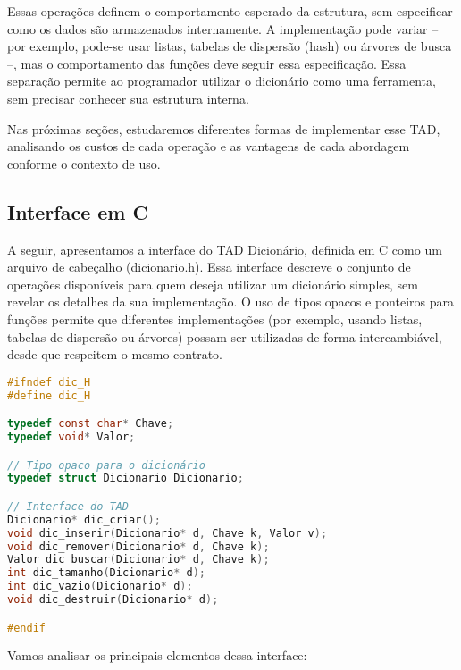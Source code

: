Essas operações definem o comportamento esperado da estrutura, sem especificar como os dados são armazenados internamente. 
A implementação pode variar -- por exemplo, pode-se usar listas, tabelas de dispersão (hash) ou árvores de busca --, mas o comportamento das funções deve seguir essa especificação. 
Essa separação permite ao programador utilizar o dicionário como uma ferramenta, sem precisar conhecer sua estrutura interna.

Nas próximas seções, estudaremos diferentes formas de implementar esse TAD, analisando os custos de cada operação e as vantagens de cada abordagem conforme o contexto de uso.


\subsection{Interface em C}

A seguir, apresentamos a interface do TAD Dicionário, definida em C como um arquivo de cabeçalho (dicionario.h). 
Essa interface descreve o conjunto de operações disponíveis para quem deseja utilizar um dicionário simples, sem revelar os detalhes da sua implementação. 
O uso de tipos opacos e ponteiros para funções permite que diferentes implementações (por exemplo, usando listas, tabelas de dispersão ou árvores) possam ser utilizadas de forma intercambiável, desde que respeitem o mesmo contrato.

\begin{lstlisting}[language=C, caption={Interface do TAD Dicionário}, label={lst:dicionario-h}]
#ifndef dic_H
#define dic_H

typedef const char* Chave;
typedef void* Valor;

// Tipo opaco para o dicionário
typedef struct Dicionario Dicionario;

// Interface do TAD
Dicionario* dic_criar();
void dic_inserir(Dicionario* d, Chave k, Valor v);
void dic_remover(Dicionario* d, Chave k);
Valor dic_buscar(Dicionario* d, Chave k);
int dic_tamanho(Dicionario* d);
int dic_vazio(Dicionario* d);
void dic_destruir(Dicionario* d);

#endif
\end{lstlisting}

Vamos analisar os principais elementos dessa interface:

